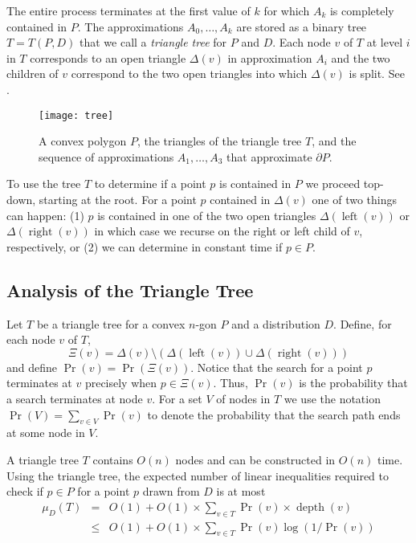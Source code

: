 \documentclass[charterfonts,lotsofwhite]{patmorin}
\newcommand{\boundary}{\partial}
\DeclareMathOperator{\depth}{depth}
\DeclareMathOperator{\lft}{left}
\DeclareMathOperator{\rght}{right}
\begin{document}
The entire process terminates at the first value of $k$ for which
$A_k$ is completely contained in $P$.  The approximations
$A_0,\ldots,A_k$ are stored as a binary tree $T=T(P,D)$ that we call a
\emph{triangle tree} for $P$ and $D$.  Each node $v$ of $T$ at level
$i$ in $T$ corresponds to an open triangle $\Delta(v)$ in
approximation $A_{i}$ and the two children of $v$ correspond to the
two open triangles into which $\Delta(v)$ is split. See .

\begin{figure}
\begin{center}\texttt{[image: tree]}\end{center}
\caption{A convex polygon $P$, the triangles of the triangle 
tree $T$, and the sequence
of approximations $A_1,\ldots,A_3$ that approximate $\boundary P$.}
\end{figure}

To use the tree $T$ to determine if a point $p$ is contained in $P$ we
proceed top-down, starting at the root.  For a point $p$ contained in
$\Delta(v)$ one of two things can happen: (1) $p$ is contained in one
of the two open triangles $\Delta(\lft(v))$ or $\Delta(\rght(v))$ in
which case we recurse on the right or left child of $v$, respectively,
or (2) we can determine in constant time if $p\in P$.

\subsection{Analysis of the Triangle Tree}

Let $T$ be a triangle tree for a convex $n$-gon $P$ and a distribution
$D$. Define, for each node $v$ of $T$,
\[
   \Xi(v)=\Delta(v)\setminus (\Delta(\lft(v))\cup \Delta(\rght(v)))
\]
and define $\Pr(v)=\Pr(\Xi(v))$.  Notice that the search for a point
$p$ terminates at $v$ precisely when $p\in\Xi(v)$.  Thus, $\Pr(v)$ is
the probability that a search terminates at node $v$.  For a set $V$
of nodes in $T$ we use the notation $\Pr(V)=\sum_{v\in V}\Pr(v)$ to
denote the probability that the search path ends at some node in $V$.

\begin{thm}
A triangle tree $T$ contains $O(n)$ nodes and can be constructed in
$O(n)$ time.
Using the triangle tree, the expected number of linear inequalities
required to check if $p\in P$ for a point $p$ drawn from $D$ is at
most
\begin{eqnarray*}
 \mu_D(T) 
   & = & O(1)+O(1)\times \sum_{v\in T}\Pr(v)\times\depth (v) \\
   &\le& O(1)+O(1)\times \sum_{v\in T}\Pr(v)\log(1/\Pr(v))
\end{eqnarray*}
\end{thm}
\end{document}
